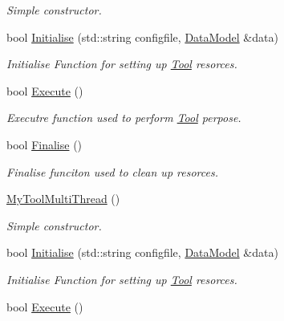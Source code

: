 \begin{DoxyCompactItemize}
\begin{DoxyCompactList}\small\item\em Simple constructor. \end{DoxyCompactList}\item 
bool \hyperlink{classMyToolMultiThread_a19dc55079a7b2da02ad9addd565b8e80}{Initialise} (std\-::string configfile, \hyperlink{classDataModel}{Data\-Model} \&data)
\begin{DoxyCompactList}\small\item\em Initialise Function for setting up \hyperlink{classTool}{Tool} resorces. \end{DoxyCompactList}\item 
\hypertarget{classMyToolMultiThread_a9cd7c894fc4797b2d81e12e25eb5beec}{bool \hyperlink{classMyToolMultiThread_a9cd7c894fc4797b2d81e12e25eb5beec}{Execute} ()}\label{classMyToolMultiThread_a9cd7c894fc4797b2d81e12e25eb5beec}

\begin{DoxyCompactList}\small\item\em Executre function used to perform \hyperlink{classTool}{Tool} perpose. \end{DoxyCompactList}\item 
\hypertarget{classMyToolMultiThread_a8f25561dc6a5daf8f4db85afecbb2c38}{bool \hyperlink{classMyToolMultiThread_a8f25561dc6a5daf8f4db85afecbb2c38}{Finalise} ()}\label{classMyToolMultiThread_a8f25561dc6a5daf8f4db85afecbb2c38}

\begin{DoxyCompactList}\small\item\em Finalise funciton used to clean up resorces. \end{DoxyCompactList}\item 
\hypertarget{classMyToolMultiThread_ac24f005c6da9c552871f6ff2672cf7f1}{\hyperlink{classMyToolMultiThread_ac24f005c6da9c552871f6ff2672cf7f1}{My\-Tool\-Multi\-Thread} ()}\label{classMyToolMultiThread_ac24f005c6da9c552871f6ff2672cf7f1}

\begin{DoxyCompactList}\small\item\em Simple constructor. \end{DoxyCompactList}\item 
bool \hyperlink{classMyToolMultiThread_a19dc55079a7b2da02ad9addd565b8e80}{Initialise} (std\-::string configfile, \hyperlink{classDataModel}{Data\-Model} \&data)
\begin{DoxyCompactList}\small\item\em Initialise Function for setting up \hyperlink{classTool}{Tool} resorces. \end{DoxyCompactList}\item 
\hypertarget{classMyToolMultiThread_a9cd7c894fc4797b2d81e12e25eb5beec}{bool \hyperlink{classMyToolMultiThread_a9cd7c894fc4797b2d81e12e25eb5beec}{Execute} ()}\label{classMyToolMultiThread_a9cd7c894fc4797b2d81e12e25eb5beec}


\end{DoxyCompactItemize}
